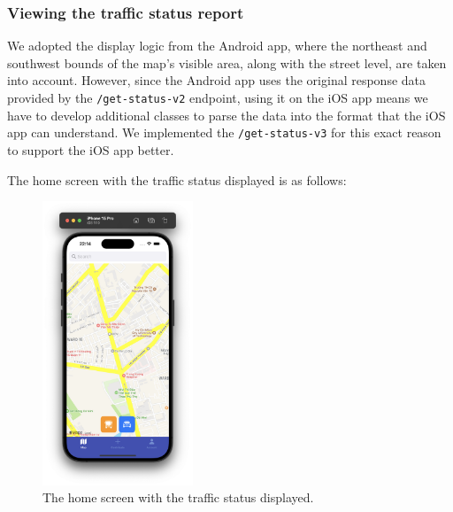 \subsubsection{Viewing the traffic status report}
We adopted the display logic from the Android app, where the northeast and southwest bounds of the map's visible area, along with the street level, are taken into account. However, since the Android app uses the original response data provided by the \lstinline{/get-status-v2} endpoint, using it on the iOS app means we have to develop additional classes to parse the data into the format that the iOS app can understand. We implemented the \lstinline{/get-status-v3} for this exact reason to support the iOS app better.

The home screen with the traffic status displayed is as follows:
\begin{figure}
    \centering
    \includegraphics[width=0.4\textwidth]{assets/images/Implementation/traffic_status_view.png}
    \caption{The home screen with the traffic status displayed.}
    \label{fig:traffic_status_view}
\end{figure}

